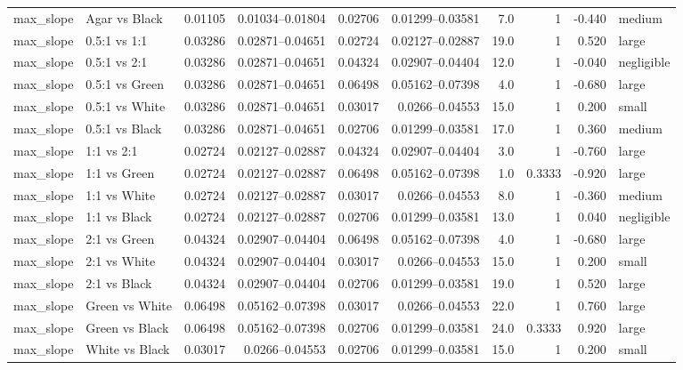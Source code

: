 \begin{longtable}{ll rr rr rrr l}
max_slope & Agar vs Black & 0.01105 & 0.01034–0.01804 & 0.02706 & 0.01299–0.03581 & 7.0 & 1 & -0.440 & medium \\
max_slope & 0.5:1 vs 1:1 & 0.03286 & 0.02871–0.04651 & 0.02724 & 0.02127–0.02887 & 19.0 & 1 & 0.520 & large \\
max_slope & 0.5:1 vs 2:1 & 0.03286 & 0.02871–0.04651 & 0.04324 & 0.02907–0.04404 & 12.0 & 1 & -0.040 & negligible \\
max_slope & 0.5:1 vs Green & 0.03286 & 0.02871–0.04651 & 0.06498 & 0.05162–0.07398 & 4.0 & 1 & -0.680 & large \\
max_slope & 0.5:1 vs White & 0.03286 & 0.02871–0.04651 & 0.03017 & 0.0266–0.04553 & 15.0 & 1 & 0.200 & small \\
max_slope & 0.5:1 vs Black & 0.03286 & 0.02871–0.04651 & 0.02706 & 0.01299–0.03581 & 17.0 & 1 & 0.360 & medium \\
max_slope & 1:1 vs 2:1 & 0.02724 & 0.02127–0.02887 & 0.04324 & 0.02907–0.04404 & 3.0 & 1 & -0.760 & large \\
max_slope & 1:1 vs Green & 0.02724 & 0.02127–0.02887 & 0.06498 & 0.05162–0.07398 & 1.0 & 0.3333 & -0.920 & large \\
max_slope & 1:1 vs White & 0.02724 & 0.02127–0.02887 & 0.03017 & 0.0266–0.04553 & 8.0 & 1 & -0.360 & medium \\
max_slope & 1:1 vs Black & 0.02724 & 0.02127–0.02887 & 0.02706 & 0.01299–0.03581 & 13.0 & 1 & 0.040 & negligible \\
max_slope & 2:1 vs Green & 0.04324 & 0.02907–0.04404 & 0.06498 & 0.05162–0.07398 & 4.0 & 1 & -0.680 & large \\
max_slope & 2:1 vs White & 0.04324 & 0.02907–0.04404 & 0.03017 & 0.0266–0.04553 & 15.0 & 1 & 0.200 & small \\
max_slope & 2:1 vs Black & 0.04324 & 0.02907–0.04404 & 0.02706 & 0.01299–0.03581 & 19.0 & 1 & 0.520 & large \\
max_slope & Green vs White & 0.06498 & 0.05162–0.07398 & 0.03017 & 0.0266–0.04553 & 22.0 & 1 & 0.760 & large \\
max_slope & Green vs Black & 0.06498 & 0.05162–0.07398 & 0.02706 & 0.01299–0.03581 & 24.0 & 0.3333 & 0.920 & large \\
max_slope & White vs Black & 0.03017 & 0.0266–0.04553 & 0.02706 & 0.01299–0.03581 & 15.0 & 1 & 0.200 & small \\
\bottomrule
\end{longtable}

